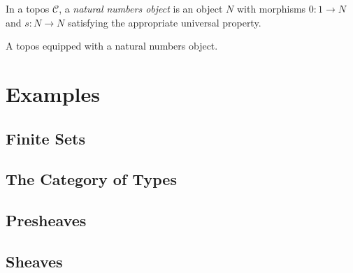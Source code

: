 \begin{definition}
\label{def:nno}
\notready
In a topos $\mathcal{C}$, a \emph{natural numbers object} is an object $N$ with morphisms $0 : 1 \to N$ and $s : N \to N$ satisfying the appropriate universal property.
\end{definition}

\begin{definition}
\label{def:topos_with_nno}
\notready
A topos equipped with a natural numbers object.
\end{definition}

\section{Examples}
\subsection{Finite Sets}
\subsection{The Category of Types}
\subsection{Presheaves}
\subsection{Sheaves}

